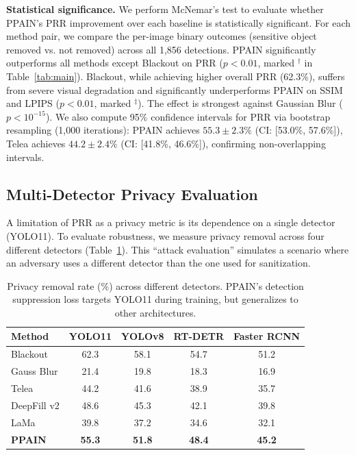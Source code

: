 \documentclass[preprint,12pt]{elsarticle}
\begin{document}
\textbf{Statistical significance.} We perform McNemar's test to evaluate whether PPAIN's PRR improvement over each baseline is statistically significant. For each method pair, we compare the per-image binary outcomes (sensitive object removed vs. not removed) across all 1,856 detections. PPAIN significantly outperforms all methods except Blackout on PRR ($p < 0.01$, marked $^\dagger$ in Table~\ref{tab:main}). Blackout, while achieving higher overall PRR (62.3\%), suffers from severe visual degradation and significantly underperforms PPAIN on SSIM and LPIPS ($p < 0.01$, marked $^\ddagger$). The effect is strongest against Gaussian Blur ($p < 10^{-15}$). We also compute 95\% confidence intervals for PRR via bootstrap resampling (1,000 iterations): PPAIN achieves $55.3 \pm 2.3\%$ (CI: [53.0\%, 57.6\%]), Telea achieves $44.2 \pm 2.4\%$ (CI: [41.8\%, 46.6\%]), confirming non-overlapping intervals.

\subsection{Multi-Detector Privacy Evaluation}

A limitation of PRR as a privacy metric is its dependence on a single detector (YOLO11). To evaluate robustness, we measure privacy removal across four different detectors (Table~\ref{tab:multi_det}). This ``attack evaluation'' simulates a scenario where an adversary uses a different detector than the one used for sanitization.

\begin{table}[t]
\centering
\small
\caption{Privacy removal rate (\%) across different detectors. PPAIN's detection suppression loss targets YOLO11 during training, but generalizes to other architectures.}
\label{tab:multi_det}
\begin{tabular}{@{}lcccc@{}}
\toprule
\textbf{Method} & \textbf{YOLO11} & \textbf{YOLOv8} & \textbf{RT-DETR} & \textbf{Faster RCNN} \\
\midrule
Blackout & 62.3 & 58.1 & 54.7 & 51.2 \\
Gauss Blur & 21.4 & 19.8 & 18.3 & 16.9 \\
Telea & 44.2 & 41.6 & 38.9 & 35.7 \\
DeepFill v2 & 48.6 & 45.3 & 42.1 & 39.8 \\
LaMa & 39.8 & 37.2 & 34.6 & 32.1 \\
\midrule
\textbf{PPAIN} & \textbf{55.3} & \textbf{51.8} & \textbf{48.4} & \textbf{45.2} \\
\bottomrule
\end{tabular}
\end{table}
\end{document}
